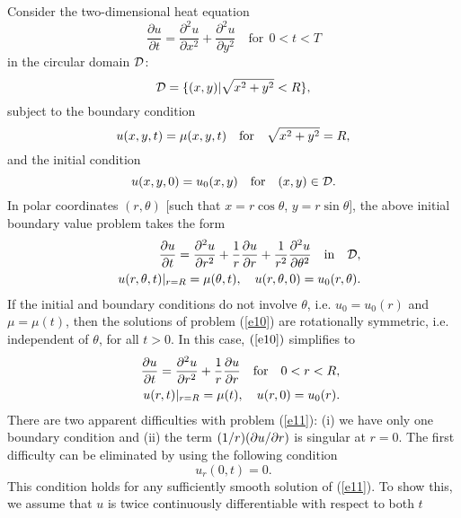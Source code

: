 \begin{example}
Consider the two-dimensional heat equation
\begin{equation}
\frac{\partial u}{\partial t}= \frac{\partial^{2}u}{\partial
x^{2}}+ \frac{\partial^{2}u}{\partial y^{2}} \quad \textrm{for} \ \ 0<t<T \label{e7}
\end{equation}
in the circular domain ${\cal D}$:
\[
{\cal D}=\{(x,y) \vert \sqrt{x^2+y^2}< R \},
\]
subject to the boundary condition
\begin{equation}
u(x,y,t)=\mu(x,y,t) \quad \hbox{for} \quad \sqrt{x^2+y^2}= R,  \label{e8}
\end{equation}
and the initial condition
\begin{equation}
u(x,y,0)=u_{0}(x,y) \quad \hbox{for} \quad (x,y)\in{\cal D}.  \label{e9}
\end{equation}
In polar coordinates $(r, \theta)$ [such that $x=r\cos\theta$, $y=r\sin\theta$],
the above initial boundary value problem takes the form
\begin{eqnarray}
&&\frac{\partial u}{\partial t}=\frac{\partial^{2}u}{\partial r^{2}}
+ \frac{1}{r}\frac{\partial u}{\partial r}+
\frac{1}{r^2}\frac{\partial^{2}u}{\partial \theta^{2}}
\quad {\rm in} \quad {\cal D},  \nonumber \\
&&u(r,\theta,t)\vert_{r=R}=\mu(\theta,t), \quad
u(r,\theta, 0)=u_{0}(r,\theta).  \label{e10}
\end{eqnarray}
If the initial and boundary conditions do not involve
$\theta$, i.e. $u_{0}=u_{0}(r)$ and $\mu=\mu(t)$, then
the solutions of problem (\ref{e10}) are rotationally symmetric, i.e.
independent of $\theta$, for all $t>0$. In this case, $(\ref{e10})$
simplifies to
\begin{eqnarray}
&&\frac{\partial u}{\partial t}=\frac{\partial^{2}u}{\partial r^{2}}
+ \frac{1}{r}\frac{\partial u}{\partial r}
\quad {\rm for} \quad 0 < r < R,  \nonumber \\
&&u(r,t)\vert_{r=R}=\mu(t), \quad
u(r, 0)=u_{0}(r).  \label{e11}
\end{eqnarray}
There are two apparent difficulties with problem (\ref{e11}): (i) we have only one boundary condition
and (ii) the term $(1/r)({\partial} u/{\partial} r)$ is singular at $r = 0$.
The first difficulty can be eliminated by using the following condition
\begin{equation}
u_r(0,t)=0.  \label{e12}
\end{equation}
This condition holds for any sufficiently smooth solution of (\ref{e11}). To show this, we assume that $u$ is twice continuously differentiable with respect to both $t$

\end{example}
